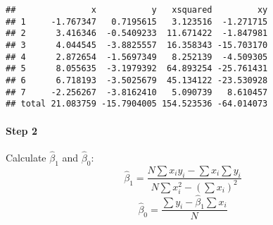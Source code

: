 \documentclass[
]{article}
\begin{document}
\begin{verbatim}
##               x           y   xsquared         xy
## 1     -1.767347   0.7195615   3.123516  -1.271715
## 2      3.416346  -0.5409233  11.671422  -1.847981
## 3      4.044545  -3.8825557  16.358343 -15.703170
## 4      2.872654  -1.5697349   8.252139  -4.509305
## 5      8.055635  -3.1979392  64.893254 -25.761431
## 6      6.718193  -3.5025679  45.134122 -23.530928
## 7     -2.256267  -3.8162410   5.090739   8.610457
## total 21.083759 -15.7904005 154.523536 -64.014073
\end{verbatim}

\hypertarget{step-2}{%
\paragraph{Step 2}\label{step-2}}

Calculate \(\hat\beta_1\) and \(\hat\beta_0\):
\[\hat\beta_1=\frac{N\sum x_iy_i-\sum x_i\sum y_i}{N\sum x_i^2-(\sum x_i)^2}\]
\[\hat\beta_0=\frac{\sum y_i -\hat\beta_1\sum x_i}{N}\]
\end{document}
